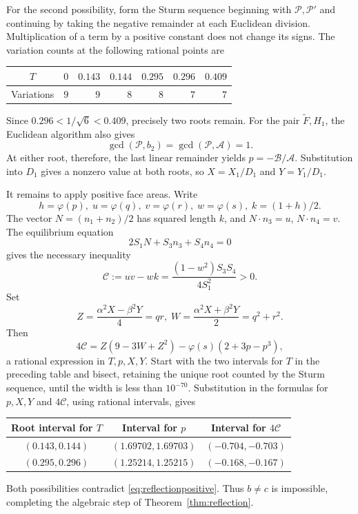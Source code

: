 \documentclass[11pt]{article}
\theoremstyle{definition}
\theoremstyle{remark}
\newcommand{\ph}{\varphi}
\begin{document}
\begin{appendices}
For the second possibility, form the Sturm sequence beginning with $\mathcal P,\mathcal P'$ and continuing by taking the negative remainder at each Euclidean division. Multiplication of a term by a positive constant does not change its signs. The variation counts at the following rational points are
\begin{center}
\begin{tabular}{crrrrrr}
\toprule
$T$ & $0$ & $0.143$ & $0.144$ & $0.295$ & $0.296$ & $0.409$\\
\midrule
Variations & $9$ & $9$ & $8$ & $8$ & $7$ & $7$\\
\bottomrule
\end{tabular}
\end{center}
Since $0.296<1/\sqrt6<0.409$, precisely two roots remain. For the pair $\widetilde F,H_1$, the Euclidean algorithm also gives
\[
\gcd(\mathcal P,b_2)=\gcd(\mathcal P,\mathcal A)=1.
\]
At either root, therefore, the last linear remainder yields $p=-\mathcal B/\mathcal A$. Substitution into $D_1$ gives a nonzero value at both roots, so $X=X_1/D_1$ and $Y=Y_1/D_1$.

It remains to apply positive face areas. Write
\[
h=\ph(p),\; u=\ph(q),\; v=\ph(r),\; w=\ph(s),
\; k=(1+h)/2.
\]
The vector $N=(n_1+n_2)/2$ has squared length $k$, and $N\cdot n_3=u$, $N\cdot n_4=v$. The equilibrium equation
\[
2S_1N+S_3n_3+S_4n_4=0
\]
gives the necessary inequality
\begin{equation}
\mathcal C:=uv-wk=\frac{(1-w^2)S_3S_4}{4S_1^2}>0.
\label{eq:reflectionpositive}
\end{equation}
Set
\[
Z=\frac{\alpha^2X-\beta^2Y}{4}=qr,\;
W=\frac{\alpha^2X+\beta^2Y}{2}=q^2+r^2.
\]
Then
\[
4\mathcal C=Z(9-3W+Z^2)-\ph(s)(2+3p-p^3),
\]
a rational expression in $T,p,X,Y$. Start with the two intervals for $T$ in the preceding table and bisect, retaining the unique root counted by the Sturm sequence, until the width is less than $10^{-70}$. Substitution in the formulas for $p,X,Y$ and $4\mathcal C$, using rational intervals, gives
\begin{center}
\begin{tabular}{ccc}
\toprule
Root interval for $T$ & Interval for $p$ & Interval for $4\mathcal C$\\
\midrule
$(0.143,0.144)$ & $(1.69702,1.69703)$ & $(-0.704,-0.703)$\\
$(0.295,0.296)$ & $(1.25214,1.25215)$ & $(-0.168,-0.167)$\\
\bottomrule
\end{tabular}
\end{center}
Both possibilities contradict \eqref{eq:reflectionpositive}. Thus $b\ne c$ is impossible, completing the algebraic step of Theorem~\ref{thm:reflection}.

\end{appendices}
\end{document}
